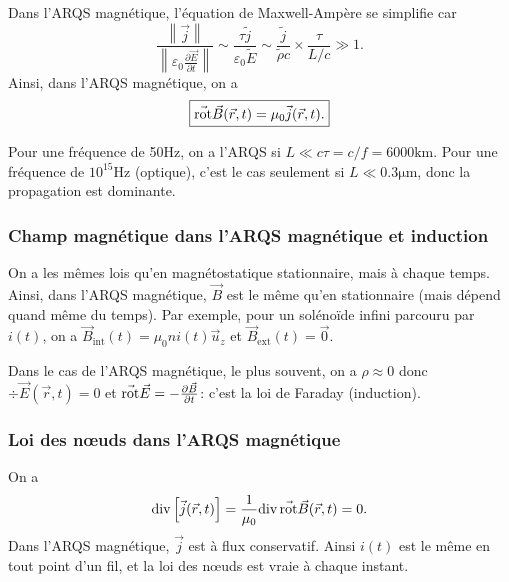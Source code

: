 Dans l'ARQS magnétique, l'équation de Maxwell-Ampère se simplifie car
\begin{equation}
    \frac{\left\lVert\vec{j}\right\rVert}{\left\lVert\varepsilon_0\frac{\partial\vec{E}}{\partial t}\right\rVert}\sim\frac{\tau\tilde{j}}{\varepsilon_0\tilde{E}}\sim\frac{\tilde{j}}{\tilde{\rho}c}\times\frac{\tau}{L/c}\gg 1.
\end{equation}
Ainsi, dans l'ARQS magnétique, on a 
\begin{equation}
    \boxed{
        \vec{\mathrm{rot}}\vec{B}(\vec{r},t)=\mu_0\vec{j}(\vec{r},t).
    }
\end{equation}

Pour une fréquence de 50$\si{\hertz}$, on a l'ARQS si $L\ll c\tau=c/f=6000\si{\kilo\metre}$. Pour une fréquence de $10^{15}\si{\hertz}$ (optique), c'est le cas seulement si $L\ll0.3\si{\micro\metre}$, donc la propagation est dominante.

\subsubsection{Champ magnétique dans l'ARQS magnétique et induction}

On a les mêmes lois qu'en magnétostatique stationnaire, mais à chaque temps. Ainsi, dans l'ARQS magnétique, $\vec{B}$ est le même qu'en stationnaire (mais dépend quand même du temps). Par exemple, pour un solénoïde infini parcouru par $i(t)$, on a $\vec{B}_{\mathrm{int}}(t)=\mu_0 ni(t)\vec{u}_z$ et $\vec{B}_{\mathrm{ext}}(t)=\vec{0}$.

Dans le cas de l'ARQS magnétique, le plus souvent, on a $\rho\approx0$ donc $\div\vec{E}(\vec{r},t)=0$ et $\vec{\mathrm{rot}}\vec{E}=-\frac{\partial\vec{B}}{\partial t}$: c'est la loi de Faraday (induction).

\subsubsection{Loi des n\oe uds dans l'ARQS magnétique}

On a 
\begin{equation}
    \mathrm{div}\left[\vec{j}(\vec{r},t)\right]=\frac{1}{\mu_0}\mathrm{div}\,\vec{\mathrm{rot}}\vec{B}(\vec{r},t)=0.
\end{equation}
Dans l'ARQS magnétique, $\vec{j}$ est à flux conservatif. Ainsi $i(t)$ est le même en tout point d'un fil, et la loi des n\oe uds est vraie à chaque instant.